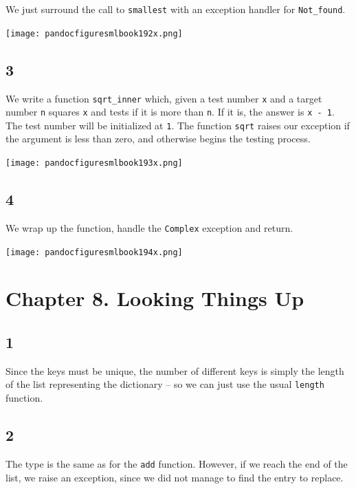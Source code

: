 \documentclass[]{book}
\begin{document}
We just surround the call to \texttt{smallest} with an exception handler for \texttt{Not\_found}.

\medskip
\begin{center}
\noindent\texttt{[image: pandocfiguresmlbook192x.png]}
\end{center}
\medskip

\subsection*{3}

We write a function \texttt{sqrt\_inner} which, given a test number \texttt{x} and a target number \texttt{n} squares \texttt{x} and tests if it is more than \texttt{n}. If it is, the answer is \texttt{x - 1}. The test number will be initialized at \texttt{1}. The function \texttt{sqrt} raises our exception if the argument is less than zero, and otherwise begins the testing process.

\medskip
\begin{center}
\noindent\texttt{[image: pandocfiguresmlbook193x.png]}
\end{center}
\medskip

\subsection*{4}
We wrap up the function, handle the \texttt{Complex} exception and return.

\medskip
\begin{center}
\noindent\texttt{[image: pandocfiguresmlbook194x.png]}
\end{center}
\medskip

\section*{Chapter 8. Looking Things Up}
\subsection*{1}
Since the keys must be unique, the number of different keys is simply the length of the list representing the dictionary -- so we can just use the usual \texttt{length} function.

\subsection*{2}

The type is the same as for the \texttt{add} function. However, if we reach the end of the list, we raise an exception, since we did not manage to find the entry to replace.
\end{document}
